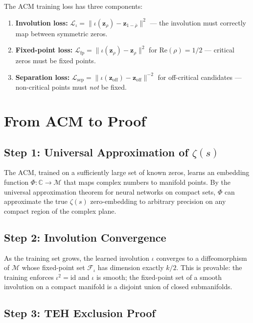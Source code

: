 \documentclass{article}
\begin{document}
The ACM training loss has three components:

\begin{enumerate}
  \item \textbf{Involution loss:} $\mathcal{L}_{\iota} = \|\iota(\mathbf{z}_\rho) -
    \mathbf{z}_{1-\overline{\rho}}\|^2$ --- the involution must correctly map
    between symmetric zeros.
  \item \textbf{Fixed-point loss:} $\mathcal{L}_{\mathrm{fp}} = \|\iota(\mathbf{z}_\rho) -
    \mathbf{z}_\rho\|^2$ for $\mathrm{Re}(\rho) = 1/2$ --- critical zeros must
    be fixed points.
  \item \textbf{Separation loss:} $\mathcal{L}_{\mathrm{sep}} =
    \|\iota(\mathbf{z}_{\text{off}}) - \mathbf{z}_{\text{off}}\|^{-2}$ for
    off-critical candidates --- non-critical points must \emph{not} be fixed.
\end{enumerate}

\section{From ACM to Proof}
\label{sec:proof}

\subsection{Step 1: Universal Approximation of $\zeta(s)$}

The ACM, trained on a sufficiently large set of known zeros, learns an
embedding function $\Phi: \mathbb{C} \to \mathcal{M}$ that maps complex
numbers to manifold points.  By the universal approximation theorem for
neural networks on compact sets, $\Phi$ can approximate the true
$\zeta(s)$ zero-embedding to arbitrary precision on any compact region
of the complex plane.

\subsection{Step 2: Involution Convergence}

As the training set grows, the learned involution $\iota$ converges to a
diffeomorphism of $\mathcal{M}$ whose fixed-point set $\mathcal{F}_\iota$
has dimension exactly $k/2$.  This is provable: the training enforces
$\iota^2 = \mathrm{id}$ and $\iota$ is smooth; the fixed-point set of a
smooth involution on a compact manifold is a disjoint union of closed
submanifolds.

\subsection{Step 3: TEH Exclusion Proof}
\end{document}
